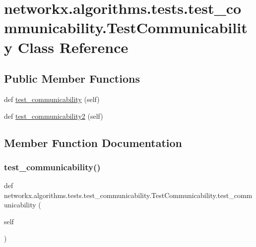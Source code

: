 \hypertarget{classnetworkx_1_1algorithms_1_1tests_1_1test__communicability_1_1TestCommunicability}{}\section{networkx.\+algorithms.\+tests.\+test\+\_\+communicability.\+Test\+Communicability Class Reference}
\label{classnetworkx_1_1algorithms_1_1tests_1_1test__communicability_1_1TestCommunicability}
\subsection*{Public Member Functions}
\begin{DoxyCompactItemize}
\item 
def \hyperlink{classnetworkx_1_1algorithms_1_1tests_1_1test__communicability_1_1TestCommunicability_ab0b13b225e3dcee9989829ee141fcd47}{test\+\_\+communicability} (self)
\item 
def \hyperlink{classnetworkx_1_1algorithms_1_1tests_1_1test__communicability_1_1TestCommunicability_a5b55e1dcba8688ae3174fdabaf17f5a5}{test\+\_\+communicability2} (self)
\end{DoxyCompactItemize}


\subsection{Member Function Documentation}
\mbox{\label{classnetworkx_1_1algorithms_1_1tests_1_1test__communicability_1_1TestCommunicability_ab0b13b225e3dcee9989829ee141fcd47}} 
\subsubsection{\texorpdfstring{test\+\_\+communicability()}{test\_communicability()}}
{\footnotesize\ttfamily def networkx.\+algorithms.\+tests.\+test\+\_\+communicability.\+Test\+Communicability.\+test\+\_\+communicability (\begin{DoxyParamCaption}\item[{}]{self }\end{DoxyParamCaption})}

